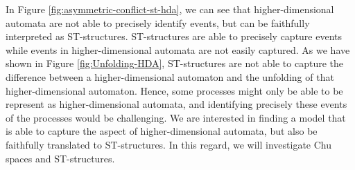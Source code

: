 




    In Figure \ref{fig:asymmetric-conflict-st-hda}, we can see that higher-dimensional automata are not able to precisely identify events, but can be faithfully interpreted as ST-structures. ST-structures are able to precisely capture events while events in higher-dimensional automata are not easily captured. As we have shown in Figure \ref{fig:Unfolding-HDA}, ST-structures are not able to capture the difference between a higher-dimensional automaton and the unfolding of that higher-dimensional automaton. Hence, some processes might only be able to be represent as higher-dimensional automata, and identifying precisely these events of the processes would be challenging. We are interested in finding a model that is able to capture the aspect of higher-dimensional automata, but also be faithfully translated to ST-structures. In this regard, we will investigate Chu spaces and ST-structures.
